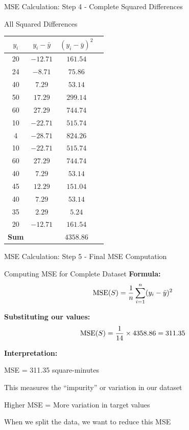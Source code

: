 \documentclass[usenames,dvipsnames]{beamer}
\begin{document}
\begin{frame}{MSE Calculation: Step 4 - Complete Squared Differences}
\begin{examplebox}{All Squared Differences}
\scriptsize
\begin{center}
\begin{tabular}{|c|c|c|c|}
\hline
\textbf{$y_i$} & \textbf{$y_i - \bar{y}$} & \textbf{$(y_i - \bar{y})^2$} \\ \hline
20 & $-12.71$ & $161.54$ \\
24 & $-8.71$ & $75.86$ \\
40 & $7.29$ & $53.14$ \\
50 & $17.29$ & $299.14$ \\
60 & $27.29$ & $744.74$ \\
10 & $-22.71$ & $515.74$ \\
4 & $-28.71$ & $824.26$ \\
10 & $-22.71$ & $515.74$ \\
60 & $27.29$ & $744.74$ \\
40 & $7.29$ & $53.14$ \\
45 & $12.29$ & $151.04$ \\
40 & $7.29$ & $53.14$ \\
35 & $2.29$ & $5.24$ \\
20 & $-12.71$ & $161.54$ \\ \hline
\textbf{Sum} & & $\mathbf{4358.86}$ \\
\hline
\end{tabular}
\end{center}
\end{examplebox}
\end{frame}

\begin{frame}{MSE Calculation: Step 5 - Final MSE Computation}
\scriptsize
\begin{examplebox}{Computing MSE for Complete Dataset}
\textbf{Formula:} 
\[
\operatorname{MSE}(S) = \frac{1}{n} \sum_{i=1}^{n} (y_i - \bar{y})^2
\]

\pause
\textbf{Substituting our values:}
\[
\operatorname{MSE}(S) = \frac{1}{14} \times 4358.86 = 311.35
\]

\pause
\textbf{Interpretation:}
\cleanitemize
{
	\item MSE = 311.35 square-minutes
	\item This measures the ``impurity'' or variation in our dataset
	\item Higher MSE = More variation in target values
	\item When we split the data, we want to reduce this MSE
}
\end{examplebox}
\end{frame}
\end{document}
